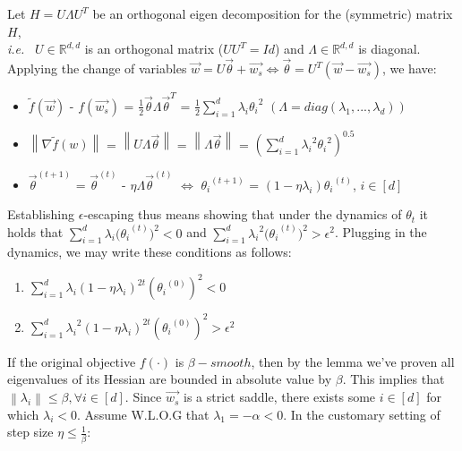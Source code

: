 \documentclass[12pt]{article}
\newcommand{\norm}[1]{\left\| #1 \right\|}
\newcommand{\ie}{{\it i.e. }}
\begin{document}
    Let $H = U \Lambda U^T$ be an orthogonal eigen decomposition for the (symmetric) matrix $H$,
    \\\ie\ $U\in\mathbb{R}^{d,d}$ is an orthogonal matrix ($UU^T=Id$) and $\Lambda\in\mathbb{R}^{d,d}$ is diagonal. Applying the change of variables $\overrightarrow{w} = U\overrightarrow{\theta} +\overrightarrow{w_s} \Longleftrightarrow \overrightarrow{\theta} = U^T(\overrightarrow{w} - \overrightarrow{w_s})$, we have:
	\begin{itemize}
      \item $\tilde{f}(\overrightarrow{w})$ - ${f}(\overrightarrow{w_s})$ = $\frac{1}{2}{\overrightarrow{\theta}}\Lambda{\overrightarrow{\theta}}^T$ = $\frac{1}{2}\sum_{i=1}^{d} \lambda_i{\theta_i}^{2}$  $(\Lambda=diag(\lambda_1, ..., \lambda_d))$
      \item $\left\lVert \nabla\tilde{f}(w) \right\lVert$ = $\left\lVert U\Lambda{\overrightarrow{\theta}} \right\lVert$ = $\left\lVert \Lambda{\overrightarrow{\theta}} \right\lVert$ = $({\sum_{i=1}^{d} {\lambda_i}^{2}{\theta_i}^{2}})^{0.5}$
      \item ${\overrightarrow{\theta}}^{(t+1)}$ = ${\overrightarrow{\theta}}^{(t)}$ - $\eta\Lambda{\overrightarrow{\theta}}^{(t)}$ $\Longleftrightarrow$ ${\theta_i}^{(t+1)}$ = $(1-\eta\lambda_i){\theta_i}^{(t)}$, $i \in[d]$
    \end{itemize}
    Establishing ${\epsilon}$-escaping thus means showing that under the dynamics of ${\theta_t}$ it holds that ${\sum_{i=1}^{d} {\lambda_i}{(\theta_i}^{(t)})^{2}} < 0 $ and ${\sum_{i=1}^{d} {\lambda_i}^{2}{(\theta_i}^{(t)})^{2}} > {\epsilon^{2}} $. Plugging in the dynamics, we may write these conditions as follows:
    
    \begin{enumerate}
      \item ${\sum_{i=1}^{d} {\lambda_i}{(1 - \eta\lambda_i)}^{2t}}{({\theta_i}^{(0)})}^{2} < 0 $
      \item ${\sum_{i=1}^{d} {{\lambda_i}^{2}}{(1 - \eta\lambda_i)}^{2t}}{({\theta_i}^{(0)})}^{2} > {{\epsilon}^{2}} $
    \end{enumerate}
    If the original objective $f(\cdot)$ is $\beta-smooth$, then by the lemma we've proven all eigenvalues of its Hessian are bounded in absolute value by $\beta$. This implies that $\norm {\lambda_i} \leq \beta , \forall {i \in [d]}$.
    Since $\overrightarrow{w_s}$ is a strict saddle, there exists some ${i \in [d]}$ for which ${\lambda_i} < 0 $. Assume W.L.O.G that ${\lambda_1} = -\alpha < 0 $. In the customary setting of step size $\eta \leq \frac{1}{\beta}$:
    
\end{document}

